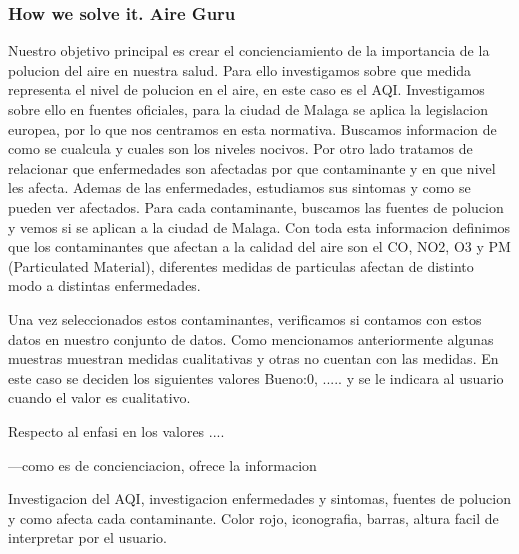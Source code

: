 \subsubsection{How we solve it. Aire Guru} 
Nuestro objetivo principal es crear el concienciamiento de la importancia de la polucion del aire en nuestra salud. Para ello investigamos sobre que
medida representa el nivel de polucion en el aire, en este caso es el AQI. Investigamos sobre ello en fuentes oficiales, para la ciudad de Malaga se aplica la 
legislacion europea, por lo que nos centramos en esta normativa.
Buscamos informacion de como se cualcula y cuales son los niveles nocivos.
Por otro lado tratamos de relacionar que enfermedades son afectadas por que contaminante y en que nivel les afecta. Ademas de las enfermedades, estudiamos sus 
sintomas y como se pueden ver afectados.
Para cada contaminante, buscamos las fuentes de polucion y vemos si se aplican a la ciudad de Malaga.
Con toda esta informacion definimos que los contaminantes que afectan a la calidad del aire son el CO, NO2, O3 y PM (Particulated Material), diferentes medidas de particulas
afectan de distinto modo a distintas enfermedades.

Una vez seleccionados estos contaminantes, verificamos si contamos con estos datos en nuestro conjunto de datos. Como mencionamos anteriormente algunas muestras
muestran medidas cualitativas y otras no cuentan con las medidas. En este caso se deciden los siguientes valores Bueno:0, ..... y se le indicara al usuario cuando el valor
es cualitativo.


Respecto al enfasi en los valores ....


---como es de concienciacion, ofrece la informacion

Investigacion del AQI, investigacion enfermedades y sintomas, fuentes de polucion y como afecta cada contaminante.
 Color rojo, iconografia, barras, altura facil de interpretar por el usuario.
\begin{itemize}
    \done
    \crossed
    
\end{itemize}
 

\newpage